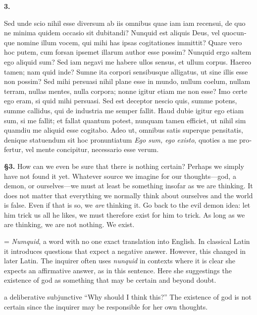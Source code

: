 
\clearpage

\beginnumbering
\pstart
    \textbf{3.} \begin{latin}Sed unde scio nihil esse diversum ab iis omnibus quae iam iam recensui, de quo ne minima quidem occasio sit dubitandi? Nunquid est aliquis Deus, vel quocunque nomine illum vocem, qui mihi has ipsas cogitationes immittit? Quare vero hoc putem, cum forsan ipsemet illarum author esse possim? Nunquid ergo saltem ego aliquid sum? Sed iam negavi me habere ullos sensus, et ullum corpus. Haereo tamen; nam quid  inde? Sumne ita corpori sensibusque alligatus, ut sine illis esse non possim? Sed mihi persuasi nihil plane esse in mundo, nullum coelum, nullam terram, nullas mentes, nulla corpora; nonne igitur etiam me non esse? Imo certe ego eram, si quid mihi persuasi. Sed est deceptor nescio quis, summe potens, summe callidus, qui de industria me semper fallit. Haud dubie igitur ego etiam sum, si me fallit; et fallat quantum potest, nunquam tamen efficiet, ut nihil sim quamdiu me aliquid esse cogitabo. Adeo ut, omnibus satis superque pensitatis, denique statuendum sit hoc pronuntiatum \textit{Ego sum, ego existo}, quoties a me profertur, vel mente concipitur, necessario esse verum.\end{latin}
\pend
\endnumbering

\prenotes

\textbf{§3.} How can we even be sure that there is nothing certain? Perhaps we simply have not found it yet. Whatever source we imagine for our thoughts---god, a demon, or ourselves---we must at least be something insofar as we are thinking. It does not matter that everything we normally think about ourselves and the world is false. Even if that is so, we \textit{are} thinking it. Go back to the evil demon idea: let him trick us all he likes, we must therefore exist for him to trick. As long as we are thinking, we are not nothing. We exist.

 = \textit{Numquid}, a word with no one exact translation into English. In classical Latin it introduces questions that expect a negative answer. However, this changed in later Latin. The inquirer often uses \textit{nunquid} in contexts where it is clear she expects an affirmative answer, as in this sentence. Here she suggestings the existence of god as something that may be certain and beyond doubt.

 a deliberative subjunctive ``Why should I think this?'' The existence of god is not certain since the inquirer may be responsible for her own thoughts.

